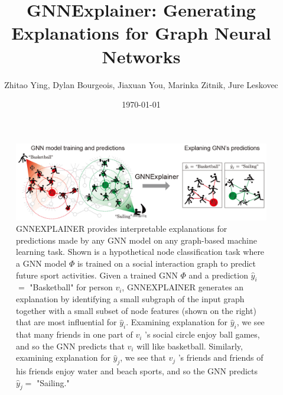 \documentclass[a4paper,10pt]{ltjsarticle}
\title{GNNExplainer: Generating Explanations for Graph Neural Networks\cite{ying2019gnnexplainer}}
\author{Zhitao Ying, Dylan Bourgeois, Jiaxuan You, Marinka Zitnik, Jure Leskovec}
\date{\today}
\newcommand{\1}{\mbox{1}\hspace{-0.25em}\mbox{l}}
\theoremstyle{definition}
\begin{document}
    \maketitle



    \begin{figure}[H]
        \centering
        \includegraphics[width=120mm]{fig/gnnexplainer_fig1}
        \caption{
            GNNEXPLAINER provides interpretable explanations for predictions made by any GNN model on
            any graph-based machine learning task. Shown is a hypothetical node classification task where
            a GNN model $\Phi$ is trained on a social interaction graph to predict future sport activities.
            Given a trained GNN $\Phi$ and a prediction $\hat{y}_{i}$ $=$ "Basketball" for person $v_{i}$,
            GNNEXPLAINER generates an explanation by identifying a small subgraph of the input graph together
            with a small subset of node features (shown on the right) that are most influential for $\hat{y}_{i}$.
            Examining explanation for $\hat{y}_{i}$, we see that many friends in one part of $v_{i}$ 's social circle
            enjoy ball games, and so the GNN predicts that $v_{i}$ will like basketball. Similarly, examining
            explanation for $\hat{y}_{j}$, we see that $v_{j}$ 's friends and friends of his friends enjoy water and
            beach sports, and so the GNN predicts $\hat{y}_{j}=$ "Sailing."}
    \end{figure}
\end{document}
